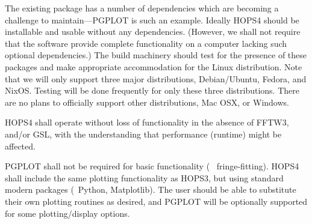 The existing package has a number of dependencies which are becoming
a challenge to maintain---\acs{PGPLOT} is such an example.  Ideally
HOPS4 should be installable and usable without any dependencies.
(However, we shall not require that the software provide complete functionality
on a computer lacking such optional dependencies.) The build machinery should test
for the presence of these packages and make appropriate accommodation for
the Linux distribution. Note that we will only support three major distributions,
Debian/Ubuntu, Fedora, and NixOS. Testing will be done frequently for only these
three distributions. There are no plans to officially support other distributions,
Mac OSX, or Windows.

\begin{description}

 HOPS4 shall operate without loss of functionality in the absence of
FFTW3, and/or GSL, with the understanding that performance (runtime) might be
affected.

 \acs{PGPLOT} shall not be required for basic functionality (\eg~
fringe-fitting). HOPS4 shall include the same plotting functionality as HOPS3,
but using standard modern packages (\eg~Python, Matplotlib). The user should
be able to substitute their own plotting routines as desired, and \acs{PGPLOT}
will be optionally supported for some plotting/display options.

\end{description}




